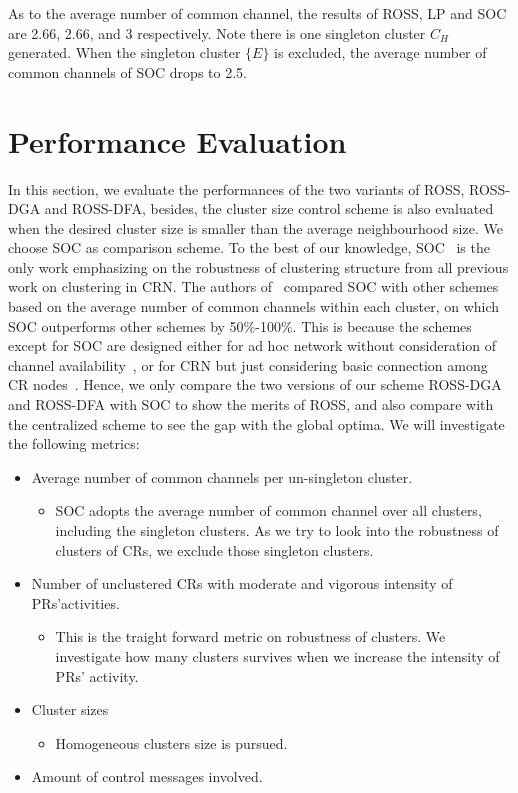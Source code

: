 As to the average number of common channel, the results of ROSS, LP and SOC are 2.66, 2.66, and 3 respectively. 
Note there is one singleton cluster $C_H$ generated.
When the singleton cluster $\{E\}$ is excluded, the average number of common channels of SOC drops to 2.5. 




\section{Performance Evaluation}
\label{performance}
In this section, we evaluate the performances of the two variants of ROSS, \ie ROSS-DGA and ROSS-DFA, besides, the cluster size control scheme is also evaluated when the desired cluster size is smaller than the average neighbourhood size.
We choose SOC as comparison scheme.
To the best of our knowledge, SOC~\cite{Lazos09} is the only work emphasizing on the robustness of clustering structure from all previous work on clustering in CRN. The authors of~\cite{Lazos09} compared SOC with other schemes based on the average number of common channels within each cluster, on which SOC outperforms other schemes by 50\%-100\%. This is because the schemes except for SOC are designed either for ad hoc network without consideration of channel availability~\cite{Basagni99}, or for CRN  but just considering basic connection among CR nodes~\cite{Zhao07}. Hence, we only compare the two versions of our scheme ROSS-DGA and ROSS-DFA with SOC to show the merits of ROSS, and also compare with the centralized scheme to see the gap with the global optima. 
We will investigate the following metrics:
\begin{itemize}
\item Average number of common channels per un-singleton cluster. 
\begin{itemize}
\item SOC adopts the average number of common channel over all clusters, \ie including the singleton clusters. As we try to look into the robustness of clusters of CRs, we exclude those singleton clusters.
\end{itemize}  

\item Number of unclustered CRs with moderate and vigorous intensity of PRs'activities.
\begin{itemize}
\item This is the traight forward metric on robustness of clusters.
We investigate how many clusters survives when we increase the intensity of PRs' activity.
\end{itemize}

\item Cluster sizes
\begin{itemize}
\item Homogeneous clusters size is pursued.
\end{itemize}

\item Amount of control messages involved.
\end{itemize}

